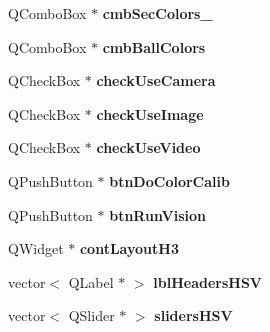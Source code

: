 \begin{DoxyCompactItemize}
\item 
\hypertarget{classMainWindow_a3140e3d75c4a3c935efd6192b520b7ec}{Q\-Combo\-Box $\ast$ {\bfseries cmb\-Sec\-Colors\-\_}}\label{classMainWindow_a3140e3d75c4a3c935efd6192b520b7ec}

\item 
\hypertarget{classMainWindow_a1487d53d2d743eecfb4e746daadd4a68}{Q\-Combo\-Box $\ast$ {\bfseries cmb\-Ball\-Colors}}\label{classMainWindow_a1487d53d2d743eecfb4e746daadd4a68}

\item 
\hypertarget{classMainWindow_a8de1e81730c2d2df009f52dbe859c65d}{Q\-Check\-Box $\ast$ {\bfseries check\-Use\-Camera}}\label{classMainWindow_a8de1e81730c2d2df009f52dbe859c65d}

\item 
\hypertarget{classMainWindow_a4070fdd896036e669ee81afa3a7a7c98}{Q\-Check\-Box $\ast$ {\bfseries check\-Use\-Image}}\label{classMainWindow_a4070fdd896036e669ee81afa3a7a7c98}

\item 
\hypertarget{classMainWindow_a04c69de59545a41d8da15f345b825780}{Q\-Check\-Box $\ast$ {\bfseries check\-Use\-Video}}\label{classMainWindow_a04c69de59545a41d8da15f345b825780}

\item 
\hypertarget{classMainWindow_a7a3ae12a08ef358c86d6ac284e34e65b}{Q\-Push\-Button $\ast$ {\bfseries btn\-Do\-Color\-Calib}}\label{classMainWindow_a7a3ae12a08ef358c86d6ac284e34e65b}

\item 
\hypertarget{classMainWindow_a4e982def3fd4017f043bc84d66fbdbc8}{Q\-Push\-Button $\ast$ {\bfseries btn\-Run\-Vision}}\label{classMainWindow_a4e982def3fd4017f043bc84d66fbdbc8}

\item 
\hypertarget{classMainWindow_a70af87214ecaf6da75b46cf6b3f9cdeb}{Q\-Widget $\ast$ {\bfseries cont\-Layout\-H3}}\label{classMainWindow_a70af87214ecaf6da75b46cf6b3f9cdeb}

\item 
\hypertarget{classMainWindow_a163df5869dfe5f2a7f7b51c23c9ec3b1}{vector$<$ Q\-Label $\ast$ $>$ {\bfseries lbl\-Headers\-H\-S\-V}}\label{classMainWindow_a163df5869dfe5f2a7f7b51c23c9ec3b1}

\item 
\hypertarget{classMainWindow_a72b8dc4fce5d34a6dca66ff90dd9cf56}{vector$<$ Q\-Slider $\ast$ $>$ {\bfseries sliders\-H\-S\-V}}\label{classMainWindow_a72b8dc4fce5d34a6dca66ff90dd9cf56}


\end{DoxyCompactItemize}
